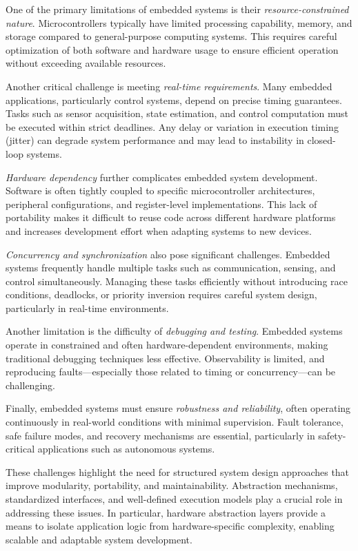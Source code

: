 One of the primary limitations of embedded systems is their \textit{resource-constrained nature}. Microcontrollers typically have limited processing capability, memory, and storage compared to general-purpose computing systems. This requires careful optimization of both software and hardware usage to ensure efficient operation without exceeding available resources.

Another critical challenge is meeting \textit{real-time requirements}. Many embedded applications, particularly control systems, depend on precise timing guarantees. Tasks such as sensor acquisition, state estimation, and control computation must be executed within strict deadlines. Any delay or variation in execution timing (jitter) can degrade system performance and may lead to instability in closed-loop systems.

\textit{Hardware dependency} further complicates embedded system development. Software is often tightly coupled to specific microcontroller architectures, peripheral configurations, and register-level implementations. This lack of portability makes it difficult to reuse code across different hardware platforms and increases development effort when adapting systems to new devices.

\textit{Concurrency and synchronization} also pose significant challenges. Embedded systems frequently handle multiple tasks such as communication, sensing, and control simultaneously. Managing these tasks efficiently without introducing race conditions, deadlocks, or priority inversion requires careful system design, particularly in real-time environments.

Another limitation is the difficulty of \textit{debugging and testing}. Embedded systems operate in constrained and often hardware-dependent environments, making traditional debugging techniques less effective. Observability is limited, and reproducing faults—especially those related to timing or concurrency—can be challenging.

Finally, embedded systems must ensure \textit{robustness and reliability}, often operating continuously in real-world conditions with minimal supervision. Fault tolerance, safe failure modes, and recovery mechanisms are essential, particularly in safety-critical applications such as autonomous systems.

These challenges highlight the need for structured system design approaches that improve modularity, portability, and maintainability. Abstraction mechanisms, standardized interfaces, and well-defined execution models play a crucial role in addressing these issues. In particular, hardware abstraction layers provide a means to isolate application logic from hardware-specific complexity, enabling scalable and adaptable system development.